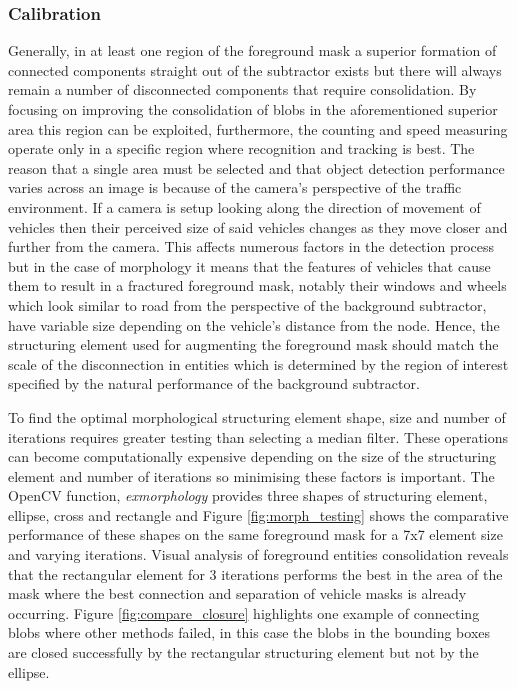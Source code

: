 \subsubsection{Calibration}

Generally, in at least one region of the foreground mask a superior formation of connected components straight out of the subtractor exists but there will always remain a number of disconnected components that require consolidation. By focusing on improving the consolidation of blobs in the aforementioned superior area this region can be exploited, furthermore, the counting and speed measuring operate only in a specific region where recognition and tracking is best. The reason that a single area must be selected and that object detection performance varies across an image is because of the camera's perspective of the traffic environment. If a camera is setup looking along the direction of movement of vehicles then their perceived size of said vehicles changes as they move closer and further from the camera. This affects numerous factors in the detection process but in the case of morphology it means that the features of vehicles that cause them to result in a fractured foreground mask, notably their windows and wheels which look similar to road from the perspective of the background subtractor, have variable size depending on the vehicle's distance from the node. Hence, the structuring element used for augmenting the foreground mask should match the scale of the disconnection in entities which is determined by the region of interest specified by the natural performance of the background subtractor. 

To find the optimal morphological structuring element shape, size and number of iterations requires greater testing than selecting a median filter. These operations can become computationally expensive depending on the size of the structuring element and number of iterations so minimising these factors is important. The OpenCV function, \emph{exmorphology} provides three shapes of structuring element, ellipse, cross and rectangle and Figure \ref{fig:morph_testing} shows the comparative performance of these shapes on the same foreground mask for a 7x7 element size and varying iterations. Visual analysis of foreground entities consolidation reveals that the rectangular element for 3 iterations performs the best in the area of the mask where the best connection and separation of vehicle masks is already occurring. Figure \ref{fig:compare_closure} highlights one example of connecting blobs where other methods failed, in this case the blobs in the bounding boxes are closed successfully by the rectangular structuring element but not by the ellipse.

